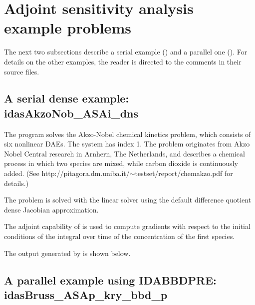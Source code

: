 \section{Adjoint sensitivity analysis example problems}\label{s:adj_examples}

The next two subsections describe a serial example () and
a parallel one ().
For details on the other examples, the reader is directed to the comments in their
source files.

\subsection{A serial dense example: idasAkzoNob\_ASAi\_dns}\label{ss:idasAkzoNob_ASAi_dns}

The  program solves the Akzo-Nobel chemical kinetics problem,
which consists of six nonlinear DAEs.  The system has index 1. 
The problem originates from Akzo Nobel Central research in Arnhern,
The Netherlands, and describes a chemical process in which two
species are mixed, while carbon dioxide is continuously added.
(See http://pitagora.dm.uniba.it/$\sim$testset/report/chemakzo.pdf for
details.)

The problem is solved with the {\idadense} linear solver using the
default difference quotient dense Jacobian approximation.

The adjoint capability of {\idas} is used to compute gradients with
respect to the initial conditions of the integral over time of the 
concentration of the first species.

The output generated by  is shown below.




\subsection{A parallel example using IDABBDPRE: idasBruss\_ASAp\_kry\_bbd\_p}
\label{ss:idasBruss_ASAp_kry_bbd_p}

